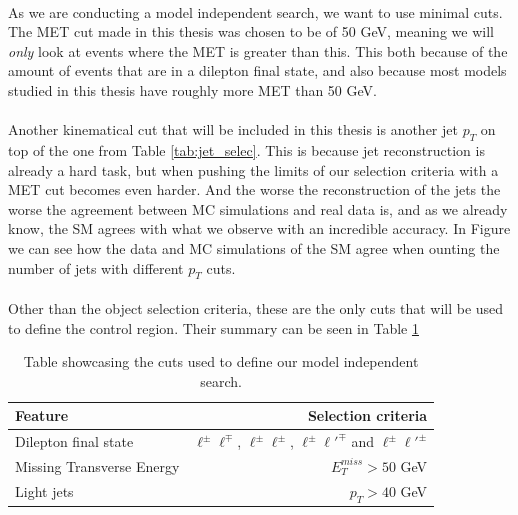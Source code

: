 \documentclass[14pt, a4paper]{book}
\begin{document}
\\As we are conducting a model independent search, we want to use minimal cuts. The MET cut made in this thesis was chosen to be of 50 GeV, meaning we will \textit{only} look at events where the MET is greater than this. 
This both because of the amount of events that are in a dilepton final state, and also because most models studied in this thesis have roughly more MET than 50 GeV.\\
\\Another kinematical cut that will be included in this thesis is another jet $p_T$ on top of the one from Table \ref{tab:jet_selec}. This is because jet reconstruction is already a hard task, but when pushing the limits of our selection criteria with a MET cut 
becomes even harder. And the worse the reconstruction of the jets the worse the agreement between MC simulations and real data is, and as we already know, the SM agrees with what we observe with an incredible accuracy. In Figure  we can see 
how the data and MC simulations of the SM agree when ounting the number of jets with different $p_T$ cuts. \\
\\Other than the object selection criteria, these are the only cuts that will be used to define the control region. Their summary can be seen in Table \ref{tab:CR_cuts}
\begin{table}[!h]
    \centering\caption[Control Region for model-indepentent search]{Table showcasing the cuts used to define our model independent search.}
    \begin{tabular}{l|r}\midrule\midrule
        Feature                                                                 & Selection criteria        \\\midrule
        Dilepton final state                                                    & $\ell^\pm \ell^\mp$, $\ell^\pm \ell^\pm$, $\ell^\pm \ell'^\mp$ and $\ell^\pm \ell'^\pm$    \\
        Missing Transverse Energy                                               & $E_T^{miss} > 50$ GeV     \\
        Light jets                                                              & $p_T > 40$ GeV     \\\midrule\midrule
    \end{tabular}
    \label{tab:CR_cuts}
\end{table}


\clearpage
\end{document}
